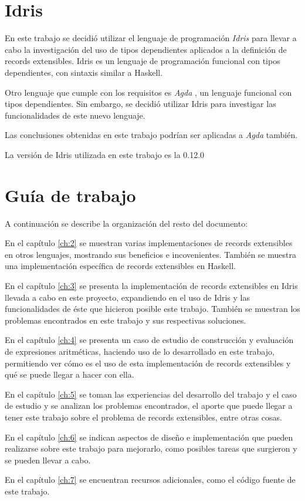 \section{Idris}

En este trabajo se decidió utilizar el lenguaje de programación \textit{Idris} \cite{brady:idris-jfp13} para llevar a cabo la investigación del uso de tipos dependientes aplicados a la definición de records extensibles. Idris es un lenguaje de programación funcional con tipos dependientes, con sintaxis similar a Haskell.

Otro lenguaje que cumple con los requisitos es \textit{Agda} \cite{Norell:2009:DTP:1481861.1481862}, un lenguaje funcional con tipos dependientes. Sin embargo, se decidió utilizar Idris para investigar las funcionalidades de este nuevo lenguaje.

Las conclusiones obtenidas en este trabajo podrían ser aplicadas a \textit{Agda} también.

La versión de Idris utilizada en este trabajo es la 0.12.0

\section{Guía de trabajo}

A continuación se describe la organización del resto del documento:

En el capítulo \ref{ch:2} se muestran varias implementaciones de records extensibles en otros lenguajes, mostrando sus beneficios e incovenientes. También se muestra una implementación específica de records extensibles en Haskell.

En el capítulo \ref{ch:3} se presenta la implementación de records extensibles en Idris llevada a cabo en este proyecto, expandiendo en el uso de Idris y las funcionalidades de éste que hicieron posible este trabajo. También se muestran los problemas encontrados en este trabajo y sus respectivas soluciones.

En el capítulo \ref{ch:4} se presenta un caso de estudio de construcción y evaluación de expresiones aritméticas, haciendo uso de lo desarrollado en este trabajo, permitiendo ver cómo es el uso de esta implementación de records extensibles y qué se puede llegar a hacer con ella.

En el capítulo \ref{ch:5} se toman las experiencias del desarrollo del trabajo y el caso de estudio y se analizan los problemas encontrados, el aporte que puede llegar a tener este trabajo sobre el problema de records extensibles, entre otras cosas.

En el capítulo \ref{ch:6} se indican aspectos de diseño e implementación que pueden realizarse sobre este trabajo para mejorarlo, como posibles tareas que surgieron y se pueden llevar a cabo.

En el capítulo \ref{ch:7} se encuentran recursos adicionales, como el código fuente de este trabajo.


